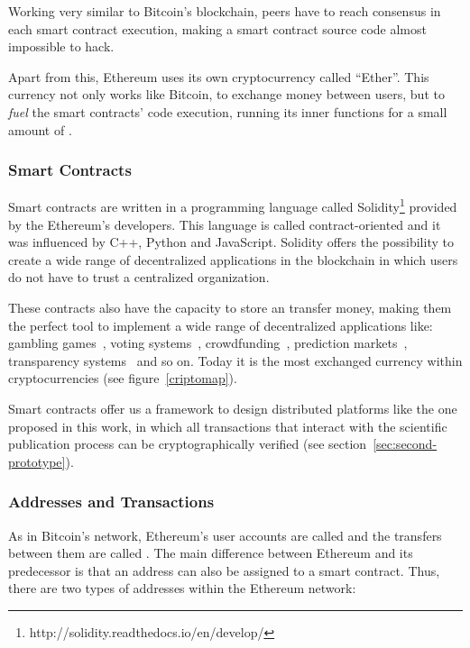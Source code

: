 Working very similar to Bitcoin's blockchain, peers have to reach consensus in
each smart contract execution, making a smart contract source code almost
impossible to hack.

Apart from this, Ethereum uses its own cryptocurrency called ``Ether''. This
currency not only works like Bitcoin, to exchange money between users, but to
\emph{fuel} the smart contracts' code execution, running its inner functions for
a small amount of .

\subsubsection*{Smart Contracts}
\label{tb:cryptos:sm}

Smart contracts are written in a programming language called
Solidity\footnote{http://solidity.readthedocs.io/en/develop/} provided by the
Ethereum's developers. This language is called contract-oriented and it was
influenced by C++, Python and JavaScript. Solidity offers the possibility to
create a wide range of decentralized applications in the blockchain in which
users do not have to trust a centralized organization.

These contracts also have the capacity to store an transfer money, making them
the perfect tool to implement a wide range of decentralized applications like:
gambling games~\cite{piasecki2016gaming}, voting
systems~\cite{mccorry2017smart}, crowdfunding~\cite{jacynycz2016betfunding},
prediction markets~\cite{peterson2015augur}, transparency
systems~\cite{bonneau2016ethiks} and so on. Today it is the most exchanged
currency within cryptocurrencies (see figure~\ref{criptomap}).

Smart contracts offer us a framework to design distributed platforms like the
one proposed in this work, in which all transactions that interact with the
scientific publication process can be cryptographically verified (see
section~\ref{sec:second-prototype}).

\subsubsection*{Addresses and Transactions}
\label{ts:at}

As in Bitcoin's network, Ethereum's user accounts are called  and
the transfers between them are called . The main difference
between Ethereum and its predecessor is that an address can also be assigned to
a smart contract. Thus, there are two types of addresses within the Ethereum
network:

